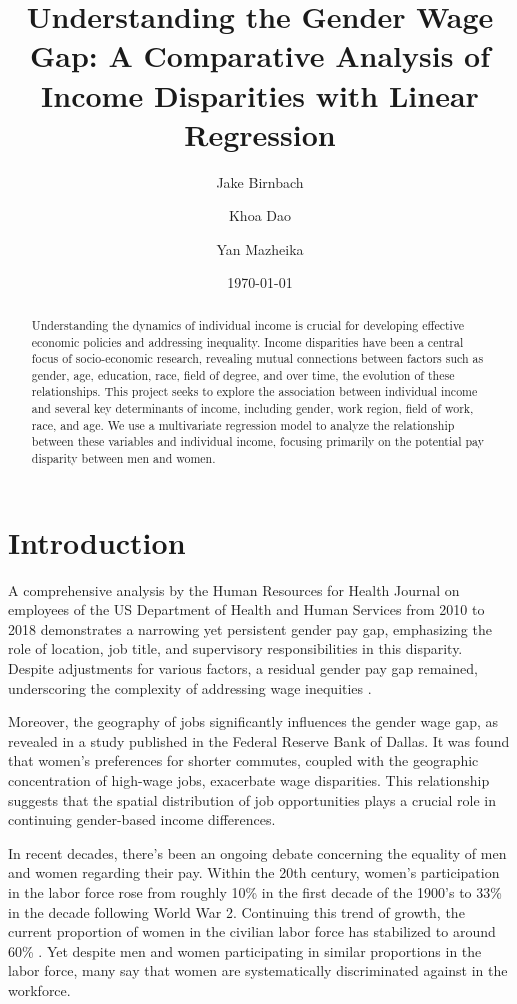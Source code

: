 \documentclass{article}
\title{Understanding the Gender Wage Gap: A Comparative Analysis of Income Disparities with Linear Regression}
\author{Jake Birnbach \and Khoa Dao \and Yan Mazheika}
\date{\today}
\begin{document}
\maketitle
\thispagestyle{empty}
\vspace{\baselineskip}
\vspace{\baselineskip}

\begin{abstract}
    Understanding the dynamics of individual income is crucial for developing effective economic policies and addressing inequality. Income disparities have been a central focus of socio-economic research, revealing mutual connections between factors such as gender, age, education, race, field of degree, and over time, the evolution of these relationships. This project seeks to explore the association between individual income and several key determinants of income,
    including gender, work region, field of work, race, and age. We use a multivariate regression model to analyze the relationship between these variables and individual income, focusing primarily on the potential pay disparity
    between men and women.
\end{abstract}

\newpage
\section*{Introduction}
A comprehensive analysis by the Human Resources for Health Journal on employees of the US Department of Health and Human Services from 2010 to 2018 demonstrates a narrowing yet persistent gender pay gap, emphasizing the role of location, job title, and supervisory responsibilities in this disparity. Despite adjustments for various factors, a residual gender pay gap remained, underscoring the complexity of addressing wage inequities \cite{HRfH}.  

Moreover, the geography of jobs significantly influences the gender wage gap, as revealed in a study published in the Federal Reserve Bank of Dallas. It was found that women's preferences for shorter commutes, coupled with the geographic concentration of high-wage jobs, exacerbate wage disparities. This relationship suggests that the spatial distribution of job opportunities plays a crucial role in continuing gender-based income differences. 

In recent decades, there’s been an ongoing debate concerning the equality of men and women regarding their pay. Within the 20th century, women’s participation in the labor force rose from roughly 10\% in the first decade of the 1900’s to 33\% in the decade following World War 2. Continuing this trend of growth, the current proportion of women in the civilian labor force has stabilized to around 60\% \cite{BLSarticle}. Yet despite men and women participating in similar proportions in the labor force, many say that women are systematically discriminated against in the workforce.
\end{document}
